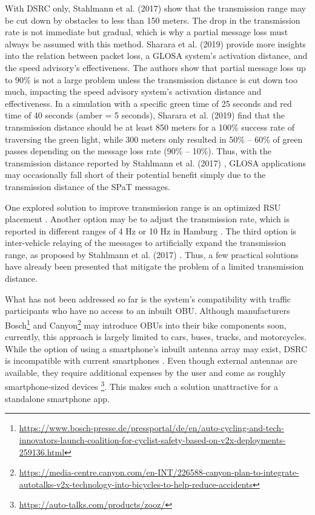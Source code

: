 With DSRC only, Stahlmann et al. (2017) \cite{stahlmann_multi-hop_2017} show that the transmission range may be cut down by obstacles to less than 150 meters. The drop in the transmission rate is not immediate but gradual, which is why a partial message loss must always be assumed with this method. Sharara et al. (2019) \cite{sharara_impact_2019} provide more insights into the relation between packet loss, a GLOSA system's activation distance, and the speed advisory's effectiveness. The authors show that partial message loss up to 90\% is not a large problem unless the transmission distance is cut down too much, impacting the speed advisory system's activation distance and effectiveness. In a simulation with a specific green time of 25 seconds and red time of 40 seconds (amber = 5 seconds), Sharara et al. (2019) \cite{sharara_impact_2019} find that the transmission distance should be at least 850 meters for a 100\% success rate of traversing the green light, while 300 meters only resulted in 50\% -- 60\% of green passes depending on the message loss rate (90\% -- 10\%). Thus, with the transmission distance reported by Stahlmann et al. (2017) \cite{stahlmann_multi-hop_2017}, GLOSA applications may occasionally fall short of their potential benefit simply due to the transmission distance of the SPaT messages.

One explored solution to improve transmission range is an optimized RSU placement \cite{mehar_optimized_2015, massobrio_smart_2015, al-ezaly_optimal_2020}. Another option may be to adjust the transmission rate, which is reported in different ranges of 4 Hz \cite{stahlmann_multi-hop_2017} or 10 Hz in Hamburg \cite{stegen_ideas_2021}. The third option is inter-vehicle relaying of the messages to artificially expand the transmission range, as proposed by Stahlmann et al. (2017) \cite{stahlmann_multi-hop_2017}. Thus, a few practical solutions have already been presented that mitigate the problem of a limited transmission distance.

What has not been addressed so far is the system's compatibility with traffic participants who have no access to an inbuilt OBU. Although manufacturers Bosch\footnote{\url{https://www.bosch-presse.de/pressportal/de/en/auto-cycling-and-tech-innovators-launch-coalition-for-cyclist-safety-based-on-v2x-deployments-259136.html}} and Canyon\footnote{\url{https://media-centre.canyon.com/en-INT/226588-canyon-plan-to-integrate-autotalks-v2x-technology-into-bicycles-to-help-reduce-accidents}} may introduce OBUs into their bike components soon, currently, this approach is largely limited to cars, buses, trucks, and motorcycles. While the option of using a smartphone's inbuilt antenna array may exist, DSRC is incompatible with current smartphones \cite{jacob_ivs-kom_2020}. Even though external antennas are available, they require additional expenses by the user and come as roughly smartphone-sized devices \cite{kim_vulnerable_2017}\footnote{\url{https://auto-talks.com/products/zooz/}}. This makes such a solution unattractive for a standalone smartphone app.

